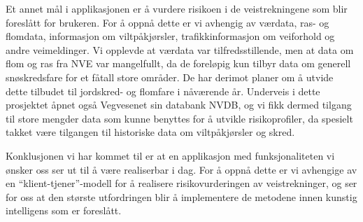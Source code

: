\documentclass[a4paper,norsk,oneside]{book}
\begin{document}
Et annet mål i applikasjonen er å vurdere risikoen i de veistrekningene som blir foreslått for brukeren. For å oppnå dette er vi avhengig av værdata, ras- og flomdata, informasjon om viltpåkjørsler, trafikkinformasjon om veiforhold og andre veimeldinger. Vi opplevde at værdata var tilfredsstillende, men at data om flom og ras fra NVE var mangelfullt, da de foreløpig kun tilbyr data om generell snøskredsfare for et fåtall store områder. De har derimot planer om å utvide dette tilbudet til jordskred- og flomfare i nåværende år. Underveis i dette prosjektet åpnet også Vegvesenet sin databank NVDB, og vi fikk dermed tilgang til store mengder data som kunne benyttes for å utvikle risikoprofiler, da spesielt takket være tilgangen til historiske data om viltpåkjørsler og skred.

Konklusjonen vi har kommet til er at en applikasjon med funksjonaliteten vi ønsker oss ser ut til å være realiserbar i dag. For å oppnå dette er vi avhengige av en “klient-tjener”-modell for å realisere risikovurderingen av veistrekninger, og ser for oss at den største utfordringen blir å implementere de metodene innen kunstig intelligens som er foreslått.



\backmatter




%
\end{document}
